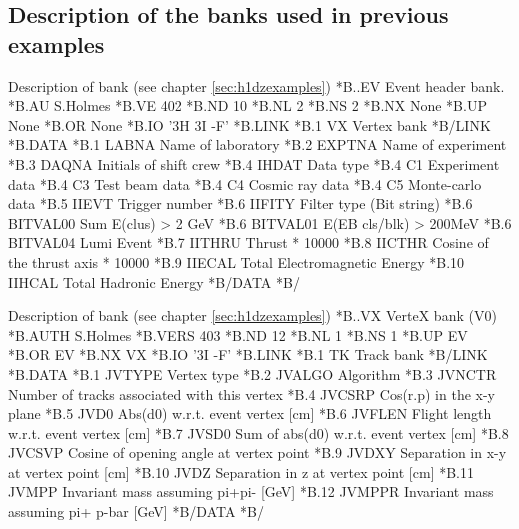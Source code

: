 
 
\subsection{Description of the banks used in previous examples}
\begin{XMPt}{Description of  bank (see chapter \ref{sec:h1dzexamples})}
*B..EV  Event header bank.
*B.AU    S.Holmes
*B.VE    402
*B.ND    10
*B.NL    2
*B.NS    2
*B.NX    None
*B.UP    None
*B.OR    None
*B.IO    '3H 3I -F'
*B.LINK
*B.1   VX       Vertex bank
*B/LINK
*B.DATA
*B.1   LABNA     Name of laboratory
*B.2   EXPTNA    Name of experiment
*B.3   DAQNA     Initials of shift crew 
*B.4   IHDAT     Data type
*B.4   C1        Experiment data
*B.4   C3        Test beam data
*B.4   C4        Cosmic ray data
*B.4   C5        Monte-carlo data
*B.5   IIEVT     Trigger number
*B.6   IIFITY    Filter type (Bit string)
*B.6   BITVAL00  Sum E(clus) > 2 GeV
*B.6   BITVAL01  E(EB cls/blk) > 200MeV
*B.6   BITVAL04  Lumi Event
*B.7   IITHRU    Thrust * 10000
*B.8   IICTHR    Cosine of the thrust axis * 10000
*B.9   IIECAL    Total Electromagnetic Energy
*B.10  IIHCAL    Total Hadronic Energy
*B/DATA
*B/
\end{XMPt}
\begin{XMPt}{Description of  bank (see chapter \ref{sec:h1dzexamples})}
*B..VX     VerteX bank (V0)
*B.AUTH    S.Holmes 
*B.VERS    403
*B.ND      12
*B.NL      1
*B.NS      1
*B.UP      EV
*B.OR      EV
*B.NX      VX
*B.IO      '3I -F'
*B.LINK
*B.1   TK       Track bank
*B/LINK
*B.DATA
*B.1   JVTYPE   Vertex type
*B.2   JVALGO   Algorithm
*B.3   JVNCTR   Number of tracks associated with this vertex
*B.4   JVCSRP   Cos(r.p) in the x-y plane
*B.5   JVD0     Abs(d0) w.r.t. event vertex            [cm]
*B.6   JVFLEN   Flight length w.r.t. event vertex      [cm]
*B.7   JVSD0    Sum of abs(d0) w.r.t. event vertex     [cm]
*B.8   JVCSVP   Cosine of opening angle at vertex point
*B.9   JVDXY    Separation in x-y at vertex point      [cm]
*B.10  JVDZ     Separation in z at vertex point        [cm]
*B.11  JVMPP    Invariant mass assuming pi+pi-        [GeV]
*B.12  JVMPPR   Invariant mass assuming pi+ p-bar     [GeV]
*B/DATA
*B/
\end{XMPt}
